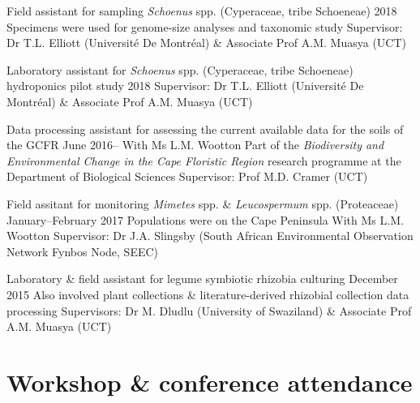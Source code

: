 \documentclass[10pt]{article}
\begin{document}
\begin{hangparas}{2em}{1}

Field assistant for sampling \textit{Schoenus} spp. (Cyperaceae, tribe 
Schoeneae)                                           \hfill {\small 2018} \break
Specimens were used for genome-size analyses and taxonomic study \break
Supervisor: Dr T.L. Elliott (Université De Montréal) \& Associate Prof A.M. 
Muasya (UCT)

Laboratory assistant for \textit{Schoenus} spp. (Cyperaceae, tribe Schoeneae) 
hydroponics pilot study                              \hfill {\small 2018} \break
Supervisor: Dr T.L. Elliott (Université De Montréal) \& Associate Prof A.M. 
Muasya (UCT)

Data processing assistant for assessing the current available data for the 
soils of the GCFR                             \hfill {\small June 2016--} \break
With Ms L.M. Wootton \break
Part of the \textit{Biodiversity and Environmental Change in the Cape Floristic 
Region} research programme at the Department of Biological Sciences \break
Supervisor: Prof M.D. Cramer (UCT)

Field assitant for monitoring \textit{Mimetes} spp. \& \textit{Leucospermum} 
spp. (Proteaceae)                  \hfill {\small January--February 2017} \break
Populations were on the Cape Peninsula \break
With Ms L.M. Wootton \break
Supervisor: Dr J.A. Slingsby (South African Environmental Observation Network 
Fynbos Node, SEEC)

Laboratory \& field assistant for legume symbiotic rhizobia culturing
                                            \hfill {\small December 2015} \break
Also involved plant collections \& literature-derived rhizobial collection 
data processing \break
Supervisors: Dr M. Dludlu (University of Swaziland) \& Associate Prof A.M. 
Muasya (UCT)


\hfill

\end{hangparas}

\section*{Workshop \& conference attendance} %
\end{document}
